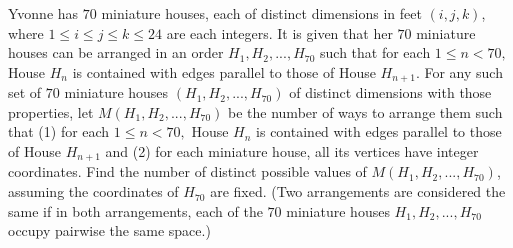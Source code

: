 Yvonne has $70$ miniature houses, each of distinct dimensions in feet $(i, j, k)$, where $1 \leq i \leq j \leq k \leq 24$ are each integers. It is given that her $70$ miniature houses can be arranged in an order $H_1, H_2, ..., H_{70}$ such that for each $1 \leq n < 70,$ House $H_n$ is contained with edges parallel to those of House $H_{n+1}.$ For any such set of $70$ miniature houses $(H_1, H_2, ..., H_{70})$ of distinct dimensions with those properties, let $M (H_1, H_2, ..., H_{70})$ be the number of ways to arrange them such that (1) for each $1 \leq n < 70,$ House $H_n$ is contained with edges parallel to those of House $H_{n+1}$ and (2) for each miniature house, all its vertices have integer coordinates. Find the number of distinct possible values of $M (H_1, H_2, ..., H_{70})$, assuming the coordinates of $H_{70}$ are fixed. (Two arrangements are considered the same if in both arrangements, each of the $70$ miniature houses $H_1, H_2, ..., H_{70}$ occupy pairwise the same space.)
